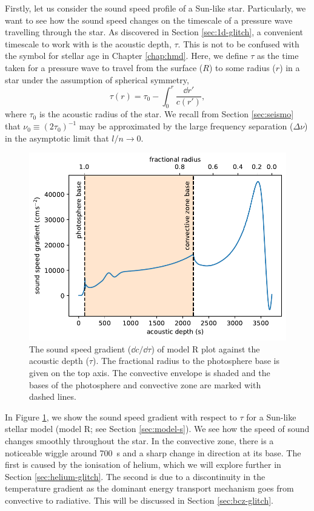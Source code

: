 Firstly, let us consider the sound speed profile of a Sun-like star. Particularly, we want to see how the sound speed changes on the timescale of a pressure wave travelling through the star. As discovered in Section \ref{sec:1d-glitch}, a convenient timescale to work with is the acoustic depth, \(\tau\). This is not to be confused with the symbol for stellar age in Chapter \ref{chap:hmd}. Here, we define \(\tau\) as the time taken for a pressure wave to travel from the surface (\(R\)) to some radius (\(r\)) in a star under the assumption of spherical symmetry,
%
\begin{equation}
    \tau(r) = \tau_0 - \int_0^{r} \frac{\dd r'}{c(r')},\label{eq:tau}
\end{equation}
%
where \(\tau_0\) is the acoustic radius of the star. We recall from Section \ref{sec:seismo} that \(\nu_0 \equiv (2\tau_0)^{-1}\) may be approximated by the large frequency separation (\(\Delta\nu\)) in the asymptotic limit that \(l/n \rightarrow 0\).

\begin{figure}[tb]
    \centering
    \includegraphics{figures/sound-speed-gradient.pdf}
    \caption[The sound speed gradient of model R plot against the acoustic depth.]{The sound speed gradient (\(\dd c/\dd \tau\)) of model R plot against the acoustic depth (\(\tau\)). The fractional radius to the photosphere base is given on the top axis. The convective envelope is shaded and the bases of the photosphere and convective zone are marked with dashed lines.}
    \label{fig:sound-speed-gradient}
\end{figure}

In Figure \ref{fig:sound-speed-gradient}, we show the sound speed gradient with respect to \(\tau\) for a Sun-like stellar model (model R; see Section \ref{sec:model-s}). We see how the speed of sound changes smoothly throughout the star. In the convective zone, there is a noticeable wiggle around \SI{700}{\second} and a sharp change in direction at its base. The first is caused by the ionisation of helium, which we will explore further in Section \ref{sec:helium-glitch}. The second is due to a discontinuity in the temperature gradient as the dominant energy transport mechanism goes from convective to radiative. This will be discussed in Section \ref{sec:bcz-glitch}.

